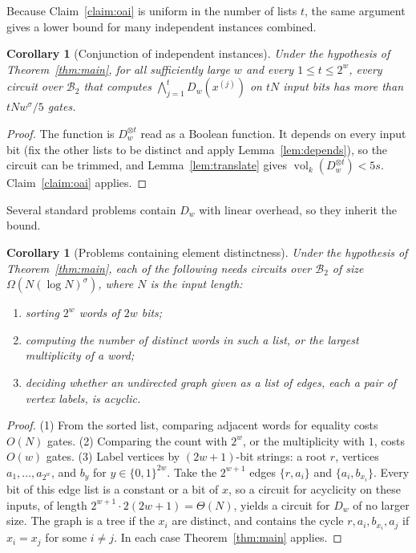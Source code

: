 \documentclass[11pt]{article}
\newtheorem{corollary}[theorem]{Corollary}
\theoremstyle{definition}
\newcommand{\vol}{\operatorname{vol}}
\newcommand{\Dw}{D_w}
\newcommand{\B}{\mathcal{B}_2}
\begin{document}
Because Claim~\ref{claim:oai} is uniform in the number of lists $t$, the same argument gives a lower bound for many independent instances combined.

\begin{corollary}[Conjunction of independent instances]\label{cor:and}
Under the hypothesis of Theorem~\ref{thm:main}, for all sufficiently large $w$ and every $1\le t\le 2^w$, every circuit over $\B$ that computes $\bigwedge_{j=1}^{t}\Dw(x^{(j)})$ on $tN$ input bits has more than $tNw^{\sigma}/5$ gates.
\end{corollary}

\begin{proof}
The function is $\Dw^{\otimes t}$ read as a Boolean function. It depends on every input bit (fix the other lists to be distinct and apply Lemma~\ref{lem:depends}), so the circuit can be trimmed, and Lemma~\ref{lem:translate} gives $\vol_k(\Dw^{\otimes t})< 5s$. Claim~\ref{claim:oai} applies.
\end{proof}

Several standard problems contain $\Dw$ with linear overhead, so they inherit the bound.

\begin{corollary}[Problems containing element distinctness]\label{cor:reductions}
Under the hypothesis of Theorem~\ref{thm:main}, each of the following needs circuits over $\B$ of size $\Omega(N(\log N)^{\sigma})$, where $N$ is the input length:
\begin{enumerate}
\item sorting $2^w$ words of $2w$ bits;
\item computing the number of distinct words in such a list, or the largest multiplicity of a word;
\item deciding whether an undirected graph given as a list of edges, each a pair of vertex labels, is acyclic.
\end{enumerate}
\end{corollary}

\begin{proof}
(1) From the sorted list, comparing adjacent words for equality costs $O(N)$ gates. (2) Comparing the count with $2^w$, or the multiplicity with $1$, costs $O(w)$ gates. (3) Label vertices by $(2w+1)$-bit strings: a root $r$, vertices $a_1,\dots,a_{2^w}$, and $b_y$ for $y\in\{0,1\}^{2w}$. Take the $2^{w+1}$ edges $\{r,a_i\}$ and $\{a_i,b_{x_i}\}$. Every bit of this edge list is a constant or a bit of $x$, so a circuit for acyclicity on these inputs, of length $2^{w+1}\cdot 2(2w+1)=\Theta(N)$, yields a circuit for $\Dw$ of no larger size. The graph is a tree if the $x_i$ are distinct, and contains the cycle $r,a_i,b_{x_i},a_j$ if $x_i=x_j$ for some $i\ne j$. In each case Theorem~\ref{thm:main} applies.
\end{proof}
\end{document}
